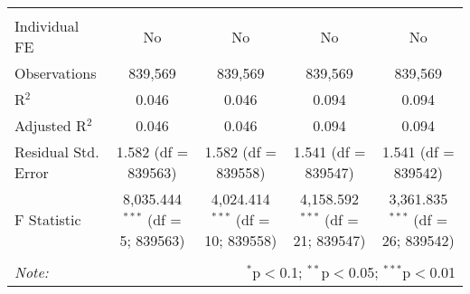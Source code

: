 \documentclass[
]{article}
\begin{document}
\begin{table}[!htbp]
{\begin{tabular}{@{\extracolsep{5pt}}lcccc}
\hline \\[-1.8ex] 
Individual FE & No & No & No & No \\ 
Observations & 839,569 & 839,569 & 839,569 & 839,569 \\ 
R$^{2}$ & 0.046 & 0.046 & 0.094 & 0.094 \\ 
Adjusted R$^{2}$ & 0.046 & 0.046 & 0.094 & 0.094 \\ 
Residual Std. Error & 1.582 (df = 839563) & 1.582 (df = 839558) & 1.541 (df = 839547) & 1.541 (df = 839542) \\ 
F Statistic & 8,035.444$^{***}$ (df = 5; 839563) & 4,024.414$^{***}$ (df = 10; 839558) & 4,158.592$^{***}$ (df = 21; 839547) & 3,361.835$^{***}$ (df = 26; 839542) \\ 
\hline 
\hline \\[-1.8ex] 
\textit{Note:}  & \multicolumn{4}{r}{$^{*}$p$<$0.1; $^{**}$p$<$0.05; $^{***}$p$<$0.01} \\ 
\end{tabular}
} 
\end{table} 
\newpage
\end{document}
